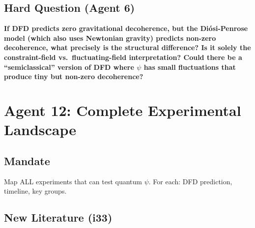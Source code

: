 \documentclass[11pt,a4paper]{article}
\begin{document}
\subsection{Hard Question (Agent 6)}

\textbf{If DFD predicts zero gravitational decoherence, but the Di\'{o}si-Penrose model (which also uses Newtonian gravity) predicts non-zero decoherence, what precisely is the structural difference? Is it solely the constraint-field vs.\ fluctuating-field interpretation? Could there be a ``semiclassical'' version of DFD where $\psi$ has small fluctuations that produce tiny but non-zero decoherence?}

\newpage

\section{Agent 12: Complete Experimental Landscape}
\label{sec:agent12}

\subsection{Mandate}

Map ALL experiments that can test quantum $\psi$. For each: DFD prediction, timeline, key groups.

\subsection{New Literature (i33)}
\end{document}
